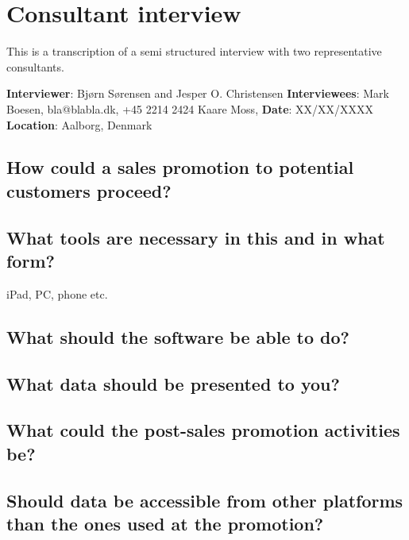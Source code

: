 \chapter{Consultant interview}
This is a transcription of a semi structured interview with two representative consultants.

\textbf{Interviewer}: Bjørn Sørensen and Jesper O. Christensen \newline
\textbf{Interviewees}: \newline
Mark Boesen, bla@blabla.dk, +45 2214 2424  \newline
Kaare Moss,   \newline
\textbf{Date}: XX/XX/XXXX \newline
\textbf{Location}: Aalborg, Denmark

\section*{How could a sales promotion to potential customers proceed?}

\section*{What tools are necessary in this and in what form?}
iPad, PC, phone etc.

\section*{What should the software be able to do?}

\section*{What data should be presented to you?}

\section*{What could the post-sales promotion activities be?}

\section*{Should data be accessible from other platforms than the ones used at the promotion?}
